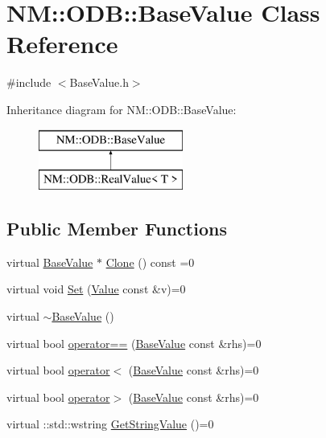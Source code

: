\hypertarget{class_n_m_1_1_o_d_b_1_1_base_value}{}\section{N\+M\+:\+:O\+D\+B\+:\+:Base\+Value Class Reference}
\label{class_n_m_1_1_o_d_b_1_1_base_value}


{\ttfamily \#include $<$Base\+Value.\+h$>$}

Inheritance diagram for N\+M\+:\+:O\+D\+B\+:\+:Base\+Value\+:\begin{figure}[H]
\begin{center}
\leavevmode
\includegraphics[height=2.000000cm]{class_n_m_1_1_o_d_b_1_1_base_value}
\end{center}
\end{figure}
\subsection*{Public Member Functions}
\begin{DoxyCompactItemize}
\item 
virtual \hyperlink{class_n_m_1_1_o_d_b_1_1_base_value}{Base\+Value} $\ast$ \hyperlink{class_n_m_1_1_o_d_b_1_1_base_value_a6e8d5f0d19f1be681fcf582e98cfdfa9}{Clone} () const  =0
\item 
virtual void \hyperlink{class_n_m_1_1_o_d_b_1_1_base_value_a343cd72d2116513509db379f6faab465}{Set} (\hyperlink{class_n_m_1_1_o_d_b_1_1_value}{Value} const \&v)=0
\item 
virtual \hyperlink{class_n_m_1_1_o_d_b_1_1_base_value_a85d4298ce766499ea78951361d89f301}{$\sim$\+Base\+Value} ()
\item 
virtual bool \hyperlink{class_n_m_1_1_o_d_b_1_1_base_value_a821b57552a15fd85e67f6d3949f19d4d}{operator==} (\hyperlink{class_n_m_1_1_o_d_b_1_1_base_value}{Base\+Value} const \&rhs)=0
\item 
virtual bool \hyperlink{class_n_m_1_1_o_d_b_1_1_base_value_ad6c041908183a43952a17dda329c372a}{operator$<$} (\hyperlink{class_n_m_1_1_o_d_b_1_1_base_value}{Base\+Value} const \&rhs)=0
\item 
virtual bool \hyperlink{class_n_m_1_1_o_d_b_1_1_base_value_aa36d79ee7fd479c798ea6adfabca0b06}{operator$>$} (\hyperlink{class_n_m_1_1_o_d_b_1_1_base_value}{Base\+Value} const \&rhs)=0
\item 
virtual \+::std\+::wstring \hyperlink{class_n_m_1_1_o_d_b_1_1_base_value_a1081e74053801b5c525c169e15f63fd3}{Get\+String\+Value} ()=0
\end{DoxyCompactItemize}
